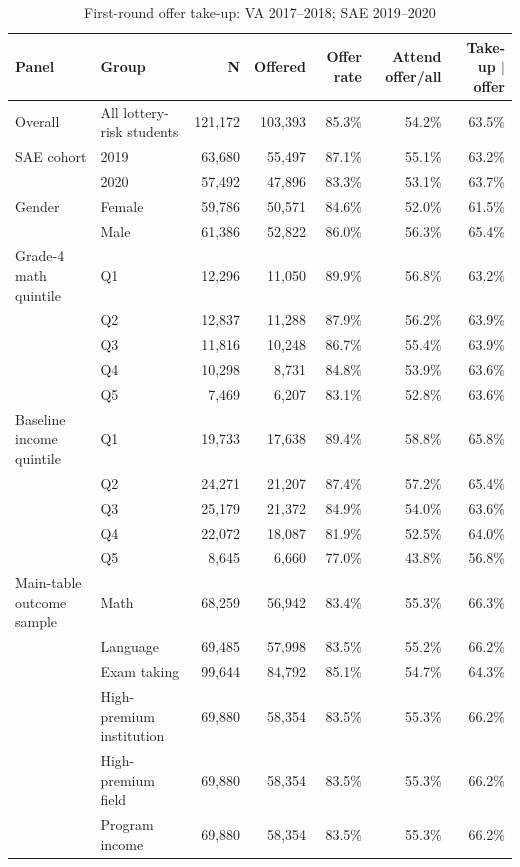 \begin{table}[!htbp]
\centering
\caption{First-round offer take-up: VA 2017--2018; SAE 2019--2020}
\label{tab:offer-takeup-no-overlap}
\begin{tabular}{llrrrrr}
\toprule
Panel & Group & N & Offered & Offer rate & Attend offer/all & Take-up $\mid$ offer \\
\midrule
Overall & All lottery-risk students & 121,172 & 103,393 & 85.3\% & 54.2\% & 63.5\% \\
\addlinespace
SAE cohort & 2019 & 63,680 & 55,497 & 87.1\% & 55.1\% & 63.2\% \\
 & 2020 & 57,492 & 47,896 & 83.3\% & 53.1\% & 63.7\% \\
\addlinespace
Gender & Female & 59,786 & 50,571 & 84.6\% & 52.0\% & 61.5\% \\
 & Male & 61,386 & 52,822 & 86.0\% & 56.3\% & 65.4\% \\
\addlinespace
Grade-4 math quintile & Q1 & 12,296 & 11,050 & 89.9\% & 56.8\% & 63.2\% \\
 & Q2 & 12,837 & 11,288 & 87.9\% & 56.2\% & 63.9\% \\
 & Q3 & 11,816 & 10,248 & 86.7\% & 55.4\% & 63.9\% \\
 & Q4 & 10,298 & 8,731 & 84.8\% & 53.9\% & 63.6\% \\
 & Q5 & 7,469 & 6,207 & 83.1\% & 52.8\% & 63.6\% \\
\addlinespace
Baseline income quintile & Q1 & 19,733 & 17,638 & 89.4\% & 58.8\% & 65.8\% \\
 & Q2 & 24,271 & 21,207 & 87.4\% & 57.2\% & 65.4\% \\
 & Q3 & 25,179 & 21,372 & 84.9\% & 54.0\% & 63.6\% \\
 & Q4 & 22,072 & 18,087 & 81.9\% & 52.5\% & 64.0\% \\
 & Q5 & 8,645 & 6,660 & 77.0\% & 43.8\% & 56.8\% \\
\addlinespace
Main-table outcome sample & Math & 68,259 & 56,942 & 83.4\% & 55.3\% & 66.3\% \\
 & Language & 69,485 & 57,998 & 83.5\% & 55.2\% & 66.2\% \\
 & Exam taking & 99,644 & 84,792 & 85.1\% & 54.7\% & 64.3\% \\
 & High-premium institution & 69,880 & 58,354 & 83.5\% & 55.3\% & 66.2\% \\
 & High-premium field & 69,880 & 58,354 & 83.5\% & 55.3\% & 66.2\% \\
 & Program income & 69,880 & 58,354 & 83.5\% & 55.3\% & 66.2\% \\

\end{tabular}
\end{table}
